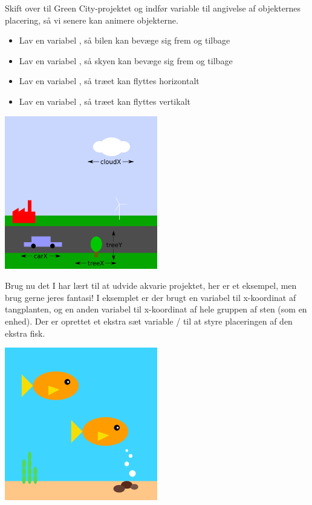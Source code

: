 \documentclass{ucph-handout}
\begin{document}
\begin{exercisebox}[adjusted title=Green City fortsat]
Skift over til Green City-projektet og indfør variable til angivelse af
objekternes placering, så vi senere kan animere objekterne.

\begin{itemize}
\item Lav en variabel , så bilen kan bevæge sig frem
  og tilbage
\item Lav en variabel , så skyen kan bevæge sig frem og tilbage
\item Lav en variabel , så træet kan flyttes horizontalt
\item Lav en variabel , så træet kan flyttes vertikalt
\end{itemize}

\begin{center}
\includegraphics[width=0.5\textwidth]{../illustrations/images/carX-cloudX-treeXY.png}
\end{center}
\end{exercisebox}

\begin{exercisebox}[adjusted title=Akvarie fortsat]
Brug nu det I har lært til at udvide akvarie projektet, her er et
eksempel, men brug gerne jeres fantasi! I eksemplet er der brugt en
variabel til x-koordinat af tangplanten, og en anden variabel til
x-koordinat af hele gruppen af sten (som en enhed). Der er oprettet et
ekstra sæt variable / til at styre
placeringen af den ekstra fisk.
\begin{center}
\includegraphics[width=0.5\textwidth]{../illustrations/images/akvarie.png}
\end{center}
\end{exercisebox}
\end{document}
